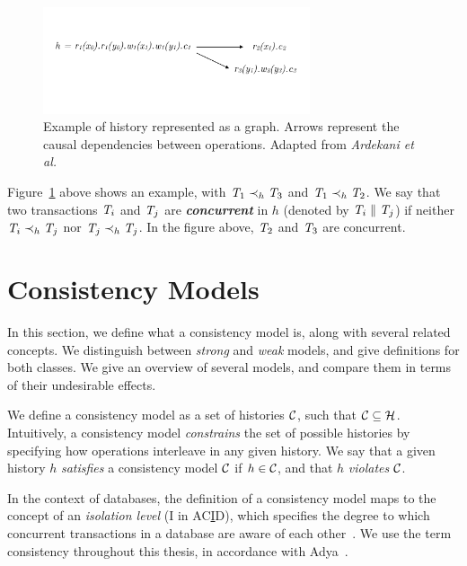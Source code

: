 \begin{figure}[h]
  \centering
  \vspace{-0.4cm}
  \includegraphics[width=0.7\textwidth]{figures/history.pdf}
  \vspace{-1cm}
  \caption{Example of history represented as a graph. Arrows represent the causal dependencies between operations. Adapted from \em{Ardekani et al.~\citep{ardekani-nsmi}}}
  \label{fig:history}
\end{figure}

Figure~\ref{fig:history} above shows an example, with $\mathit{T}_1 \prec_h \mathit{T}_3$ and $\mathit{T}_1 \prec_h \mathit{T}_2$. We say that two transactions $\mathit{T}_i$ and $\mathit{T}_j$ are \textbf{\em concurrent} in $h$ (denoted by $\mathit{T}_i \parallel \mathit{T}_j$) if neither $\mathit{T}_i \prec_h \mathit{T}_j$ nor $\mathit{T}_j \prec_h \mathit{T}_j$. In the figure above, $\mathit{T}_2$ and $\mathit{T}_3$ are concurrent.

\section{Consistency Models}

In this section, we define what a consistency model is, along with several related concepts. We distinguish between \emph{strong} and \emph{weak} models, and give definitions for both classes. We give an overview of several models, and compare them in terms of their undesirable effects.

We define a consistency model as a set of histories $\mathcal{C}$, such that $\mathcal{C} \subseteq \mathcal{H}$. Intuitively, a consistency model \emph{constrains} the set of possible histories by specifying how operations interleave in any given history. We say that a given history $h$ \emph{satisfies} a consistency model $\mathcal{C}$ if $h \in \mathcal{C}$, and that $h$ \emph{violates} $\mathcal{C}$.

In the context of databases, the definition of a consistency model maps to the concept of an \emph{isolation level} (I in AC\underline{I}D), which specifies the degree to which concurrent transactions in a database are aware of each other~\citep{adya_thesis}. We use the term consistency throughout this thesis, in accordance with Adya~\citep{adya_thesis}.

